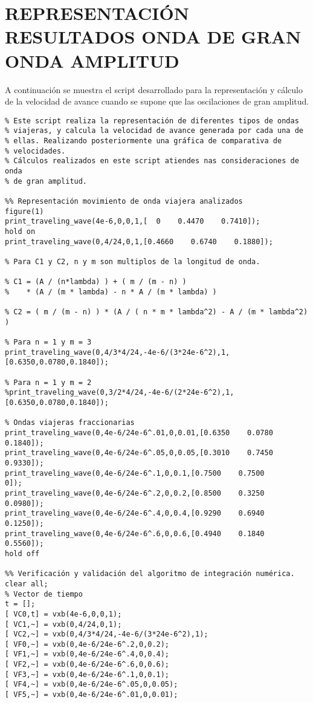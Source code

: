 \section{REPRESENTACIÓN RESULTADOS ONDA DE GRAN ONDA AMPLITUD} \label{anex:Anexo4}
A continuación se muestra el script desarrollado para la representación y cálculo de la velocidad de avance cuando se supone que las oscilaciones de gran amplitud.

\begin{lstlisting}[]
%% ANÁLISIS VXB
% Este script realiza la representación de diferentes tipos de ondas
% viajeras, y calcula la velocidad de avance generada por cada una de
% ellas. Realizando posteriormente una gráfica de comparativa de
% velocidades.
% Cálculos realizados en este script atiendes nas consideraciones de onda
% de gran amplitud.

%% Representación movimiento de onda viajera analizados
figure(1)
print_traveling_wave(4e-6,0,0,1,[  0    0.4470    0.7410]);
hold on
print_traveling_wave(0,4/24,0,1,[0.4660    0.6740    0.1880]);

% Para C1 y C2, n y m son multiplos de la longitud de onda.  

% C1 = (A / (n*lambda) ) + ( m / (m - n) )
%    * (A / (m * lambda) - n * A / (m * lambda) )

% C2 = ( m / (m - n) ) * (A / ( n * m * lambda^2) - A / (m * lambda^2) )

% Para n = 1 y m = 3
print_traveling_wave(0,4/3*4/24,-4e-6/(3*24e-6^2),1,[0.6350,0.0780,0.1840]);

% Para n = 1 y m = 2
%print_traveling_wave(0,3/2*4/24,-4e-6/(2*24e-6^2),1,[0.6350,0.0780,0.1840]);

% Ondas viajeras fraccionarias
print_traveling_wave(0,4e-6/24e-6^.01,0,0.01,[0.6350    0.0780    0.1840]);
print_traveling_wave(0,4e-6/24e-6^.05,0,0.05,[0.3010    0.7450    0.9330]);
print_traveling_wave(0,4e-6/24e-6^.1,0,0.1,[0.7500    0.7500         0]);
print_traveling_wave(0,4e-6/24e-6^.2,0,0.2,[0.8500    0.3250    0.0980]);
print_traveling_wave(0,4e-6/24e-6^.4,0,0.4,[0.9290    0.6940    0.1250]);
print_traveling_wave(0,4e-6/24e-6^.6,0,0.6,[0.4940    0.1840    0.5560]);
hold off

%% Verificación y validación del algoritmo de integración numérica.
clear all;
% Vector de tiempo
t = [];
[ VC0,t] = vxb(4e-6,0,0,1);
[ VC1,~] = vxb(0,4/24,0,1);
[ VC2,~] = vxb(0,4/3*4/24,-4e-6/(3*24e-6^2),1);
[ VF0,~] = vxb(0,4e-6/24e-6^.2,0,0.2);
[ VF1,~] = vxb(0,4e-6/24e-6^.4,0,0.4);
[ VF2,~] = vxb(0,4e-6/24e-6^.6,0,0.6);
[ VF3,~] = vxb(0,4e-6/24e-6^.1,0,0.1);
[ VF4,~] = vxb(0,4e-6/24e-6^.05,0,0.05);
[ VF5,~] = vxb(0,4e-6/24e-6^.01,0,0.01);


\end{lstlisting}
